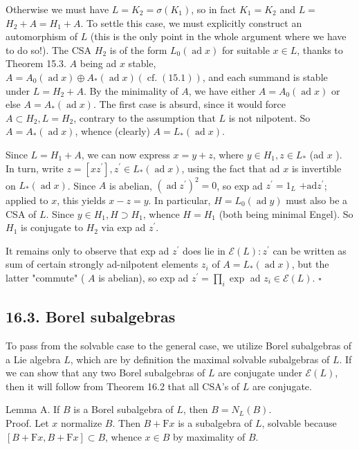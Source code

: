 \documentclass[10pt]{article}
\begin{document}
Otherwise we must have $L=K_{2}=\sigma\left(K_{1}\right)$, so in fact $K_{1}=K_{2}$ and $L=$ $H_{2}+A=H_{1}+A$. To settle this case, we must explicitly construct an automorphism of $L$ (this is the only point in the whole argument where we have to do so!). The CSA $H_{2}$ is of the form $L_{0}(\operatorname{ad} x)$ for suitable $x \in L$, thanks to Theorem 15.3. $A$ being ad $x$ stable, $A=A_{0}(\operatorname{ad} x) \oplus A_{*}(\operatorname{ad} x)(\operatorname{cf.}(15.1))$, and each summand is stable under $L=H_{2}+A$. By the minimality of $A$, we have either $A=A_{0}(\operatorname{ad} x)$ or else $A=A_{*}(\operatorname{ad} x)$. The first case is absurd, since it would force $A \subset H_{2}, L=H_{2}$, contrary to the assumption that $L$ is not nilpotent. So $A=A_{*}(\operatorname{ad} x)$, whence (clearly) $A=L_{*}(\operatorname{ad} x)$.

Since $L=H_{1}+A$, we can now express $x=y+z$, where $y \in H_{1}, z \in L_{*}$ (ad $x$ ). In turn, write $z=\left[x z^{\prime}\right], z^{\prime} \in L_{*}(\operatorname{ad} x)$, using the fact that ad $x$ is invertible on $L_{*}(\operatorname{ad} x)$. Since $A$ is abelian, $\left(\operatorname{ad} z^{\prime}\right)^{2}=0$, so exp ad $z^{\prime}=1_{L}$ $+\mathrm{ad} z^{\prime}$; applied to $x$, this yields $x-z=y$. In particular, $H=L_{0}(\operatorname{ad} y)$ must also be a CSA of $L$. Since $y \in H_{1}, H \supset H_{1}$, whence $H=H_{1}$ (both being minimal Engel). So $H_{1}$ is conjugate to $H_{2}$ via exp ad $z^{\prime}$.

It remains only to observe that exp ad $z^{\prime}$ does lie in $\mathscr{E}(L): z^{\prime}$ can be written as sum of certain strongly ad-nilpotent elements $z_{i}$ of $A=L_{*}(\operatorname{ad} x)$, but the latter "commute" ( $A$ is abelian), so exp ad $z^{\prime}=\prod_{i} \exp$ ad $z_{i} \in \mathscr{E}(L)$. $\square$

\subsection*{16.3. Borel subalgebras}
To pass from the solvable case to the general case, we utilize Borel subalgebras of a Lie algebra $L$, which are by definition the maximal solvable subalgebras of $L$. If we can show that any two Borel subalgebras of $L$ are conjugate under $\mathscr{E}(L)$, then it will follow from Theorem 16.2 that all CSA's of $L$ are conjugate.

Lemma A. If $B$ is a Borel subalgebra of $L$, then $B=N_{L}(B)$.\\
Proof. Let $x$ normalize $B$. Then $B+\mathrm{F} x$ is a subalgebra of $L$, solvable because $[B+\mathrm{F} x, B+\mathrm{F} x] \subset B$, whence $x \in B$ by maximality of $B$.
\end{document}
